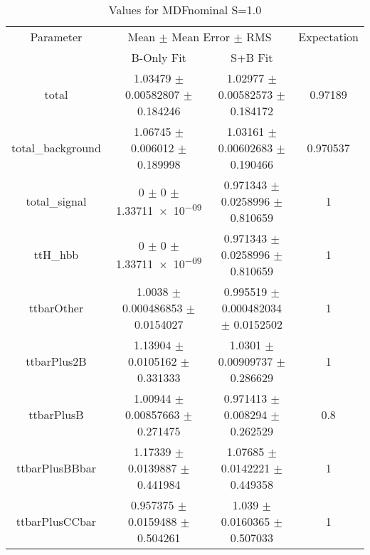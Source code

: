 \begin{table}
\centering
\caption{Values for MDFnominal S=1.0}
\begin{tabular}{cccc}
\toprule
Parameter & \multicolumn{2}{c}{Mean $\pm$ Mean Error $\pm$ RMS} & Expectation\\
 & B-Only Fit & S+B Fit & \\
\midrule
total & \num{1.03479} $\pm$ \num{0.00582807} $\pm$ \num{0.184246} & \num{1.02977} $\pm$ \num{0.00582573} $\pm$ \num{0.184172} & \num{0.97189}\\
total\_background & \num{1.06745} $\pm$ \num{0.006012} $\pm$ \num{0.189998} & \num{1.03161} $\pm$ \num{0.00602683} $\pm$ \num{0.190466} & \num{0.970537}\\
total\_signal & \num{0} $\pm$ \num{0} $\pm$ \num{1.33711e-09} & \num{0.971343} $\pm$ \num{0.0258996} $\pm$ \num{0.810659} & \num{1}\\
ttH\_hbb & \num{0} $\pm$ \num{0} $\pm$ \num{1.33711e-09} & \num{0.971343} $\pm$ \num{0.0258996} $\pm$ \num{0.810659} & \num{1}\\
ttbarOther & \num{1.0038} $\pm$ \num{0.000486853} $\pm$ \num{0.0154027} & \num{0.995519} $\pm$ \num{0.000482034} $\pm$ \num{0.0152502} & \num{1}\\
ttbarPlus2B & \num{1.13904} $\pm$ \num{0.0105162} $\pm$ \num{0.331333} & \num{1.0301} $\pm$ \num{0.00909737} $\pm$ \num{0.286629} & \num{1}\\
ttbarPlusB & \num{1.00944} $\pm$ \num{0.00857663} $\pm$ \num{0.271475} & \num{0.971413} $\pm$ \num{0.008294} $\pm$ \num{0.262529} & \num{0.8}\\
ttbarPlusBBbar & \num{1.17339} $\pm$ \num{0.0139887} $\pm$ \num{0.441984} & \num{1.07685} $\pm$ \num{0.0142221} $\pm$ \num{0.449358} & \num{1}\\
ttbarPlusCCbar & \num{0.957375} $\pm$ \num{0.0159488} $\pm$ \num{0.504261} & \num{1.039} $\pm$ \num{0.0160365} $\pm$ \num{0.507033} & \num{1}\\
\bottomrule
\end{tabular}
\end{table}